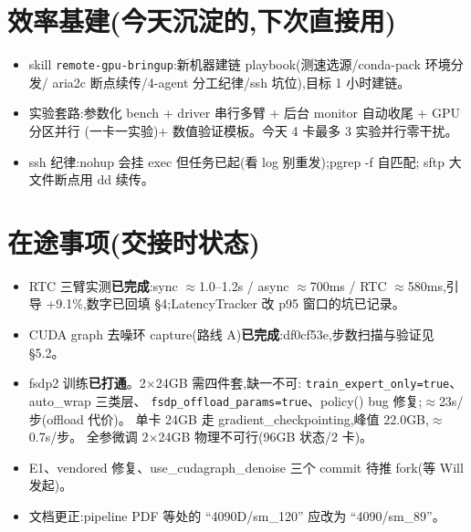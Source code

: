 \documentclass[11pt]{ctexart}
\begin{document}
\section{效率基建(今天沉淀的,下次直接用)}
\begin{itemize}
\item skill \texttt{remote-gpu-bringup}:新机器建链 playbook(测速选源/conda-pack 环境分发/
aria2c 断点续传/4-agent 分工纪律/ssh 坑位),目标 1 小时建链。
\item 实验套路:参数化 bench + driver 串行多臂 + 后台 monitor 自动收尾 + GPU 分区并行
(一卡一实验)+ 数值验证模板。今天 4 卡最多 3 实验并行零干扰。
\item ssh 纪律:nohup 会挂 exec 但任务已起(看 log 别重发);pgrep -f 自匹配;
sftp 大文件断点用 dd 续传。
\end{itemize}

\section*{在途事项(交接时状态)}
\begin{itemize}[itemsep=0pt,topsep=1pt,parsep=0pt]
\item RTC 三臂实测\textbf{已完成}:sync $\approx$1.0--1.2s / async $\approx$700ms /
RTC $\approx$580ms,引导 +9.1\%,数字已回填 §4;LatencyTracker 改 p95 窗口的坑已记录。
\item CUDA graph 去噪环 capture(路线 A)\textbf{已完成}:df0cf53e,步数扫描与验证见 §5.2。
\item fsdp2 训练\textbf{已打通}。2$\times$24GB 需四件套,缺一不可:
\texttt{train\_expert\_only=true}、auto\_wrap 三类层、
\texttt{fsdp\_offload\_params=true}、policy() bug 修复;$\approx$23s/步(offload 代价)。
单卡 24GB 走 gradient\_checkpointing,峰值 22.0GB,$\approx$0.7s/步。
全参微调 2$\times$24GB 物理不可行(96GB 状态/2 卡)。
\item E1、vendored 修复、use\_cudagraph\_denoise 三个 commit 待推 fork(等 Will 发起)。
\item 文档更正:pipeline PDF 等处的 ``4090D/sm\_120'' 应改为 ``4090/sm\_89''。
\end{itemize}
\end{document}
